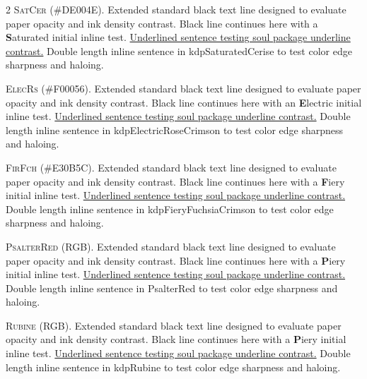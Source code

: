 \begin{multicols}{2}
\lettrine[lines=2]{\textcolor{kdpSaturatedCerise}{S}}{atCer} (\#DE004E). Extended standard black text line designed to evaluate paper opacity and ink density contrast. Black line continues here with a \textbf{\textcolor{kdpSaturatedCerise}{S}}aturated initial inline test. \ul{Underlined sentence testing soul package underline contrast.} \textcolor{kdpSaturatedCerise}{Double length inline sentence in kdpSaturatedCerise to test color edge sharpness and haloing.}


\lettrine[lines=2]{\textcolor{kdpElectricRoseCrimson}{E}}{lecRs} (\#F00056). Extended standard black text line designed to evaluate paper opacity and ink density contrast. Black line continues here with an \textbf{\textcolor{kdpElectricRoseCrimson}{E}}lectric initial inline test. \ul{Underlined sentence testing soul package underline contrast.} \textcolor{kdpElectricRoseCrimson}{Double length inline sentence in kdpElectricRoseCrimson to test color edge sharpness and haloing.}


\lettrine[lines=2]{\textcolor{kdpFieryFuchsiaCrimson}{F}}{irFch} (\#E30B5C). Extended standard black text line designed to evaluate paper opacity and ink density contrast. Black line continues here with a \textbf{\textcolor{kdpFieryFuchsiaCrimson}{F}}iery initial inline test. \ul{Underlined sentence testing soul package underline contrast.} \textcolor{kdpFieryFuchsiaCrimson}{Double length inline sentence in kdpFieryFuchsiaCrimson to test color edge sharpness and haloing.}


\lettrine[lines=2]{\textcolor{PsalterRed}{P}}{salterRed} (RGB). Extended standard black text line designed to evaluate paper opacity and ink density contrast. Black line continues here with a \textbf{\textcolor{PsalterRed}{P}}iery initial inline test. \ul{Underlined sentence testing soul package underline contrast.} \textcolor{PsalterRed}{Double length inline sentence in PsalterRed to test color edge sharpness and haloing.}


\lettrine[lines=2]{\textcolor{kdpRubine}{R}}{ubine} (RGB). Extended standard black text line designed to evaluate paper opacity and ink density contrast. Black line continues here with a \textbf{\textcolor{kdpRubine}{P}}iery initial inline test. \ul{Underlined sentence testing soul package underline contrast.} \textcolor{kdpRubine}{Double length inline sentence in kdpRubine to test color edge sharpness and haloing.}



\end{multicols}
